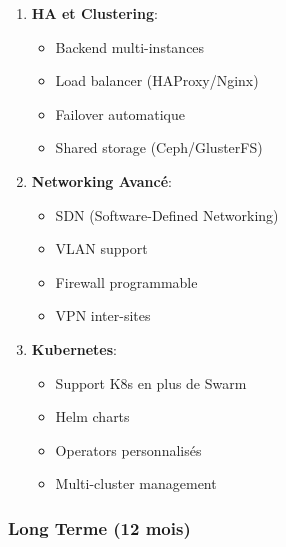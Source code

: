 \documentclass[12pt,a4paper]{article}
\begin{document}
\begin{enumerate}
    \item \textbf{HA et Clustering}:
    \begin{itemize}
        \item Backend multi-instances
        \item Load balancer (HAProxy/Nginx)
        \item Failover automatique
        \item Shared storage (Ceph/GlusterFS)
    \end{itemize}
    
    \item \textbf{Networking Avancé}:
    \begin{itemize}
        \item SDN (Software-Defined Networking)
        \item VLAN support
        \item Firewall programmable
        \item VPN inter-sites
    \end{itemize}
    
    \item \textbf{Kubernetes}:
    \begin{itemize}
        \item Support K8s en plus de Swarm
        \item Helm charts
        \item Operators personnalisés
        \item Multi-cluster management
    \end{itemize}
\end{enumerate}

\subsubsection{Long Terme (12 mois)}
\end{document}
